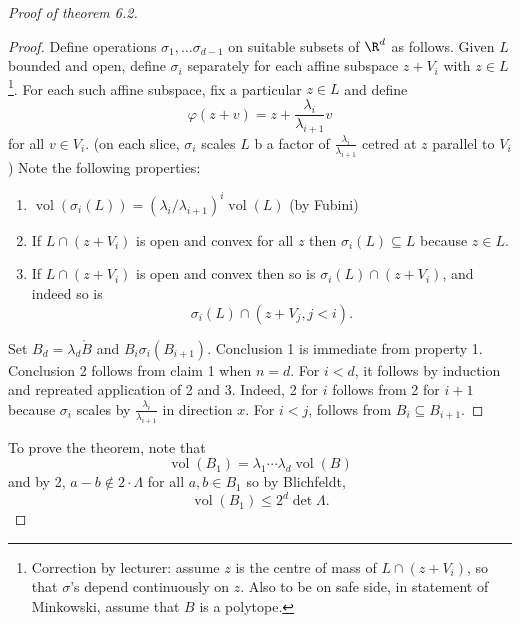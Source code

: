 \documentclass[a4paper]{article}
\begin{document}
\begin{proof}[Proof of theorem 6.2]
  \begin{proof}
    Define operations \(\sigma_1, \dots \sigma_{d - 1}\) on suitable subsets of \(\R^d\) as follows. Given \(L\) bounded and open, define \(\sigma_i\) separately for each affine subspace \(z + V_i\) with \(z \in L\)\footnote{Correction by lecturer: assume \(z\) is the centre of mass of \(L \cap (z + V_i)\), so that \(\sigma\)'s depend continuously on \(z\). Also to be on safe side, in statement of Minkowski, assume that \(B\) is a polytope.}. For each such affine subspace, fix a particular \(z \in L\) and define
    \[
      \varphi(z + v) = z + \frac{\lambda_i}{\lambda_{i + 1}} v
    \]
    for all \(v \in V_i\). (on each slice, \(\sigma_i\) scales \(L\) b a factor of \(\frac{\lambda_i}{\lambda_{i + 1}}\) cetred at \(z\) parallel to \(V_i\)) Note the following properties:
    \begin{enumerate}
    \item \(\operatorname{vol}(\sigma_i(L)) = (\lambda_i/\lambda_{i + 1})^i \operatorname{vol}(L)\) (by Fubini)
    \item If \(L \cap (z + V_i)\) is open and convex for all \(z\) then \(\sigma_i(L) \subseteq L\) because \(z \in L\).
    \item If \(L \cap (z + V_i)\) is open and convex then so is \(\sigma_i(L) \cap (z + V_i)\), and indeed so is
      \[
        \sigma_i(L) \cap (z + V_j, j < i).
      \]
    \end{enumerate}
    Set \(B_d = \lambda_d \ocirc B\) and \(B_i \sigma_i(B_{i + 1})\). Conclusion 1 is immediate from property 1. Conclusion 2 follows from claim 1 when \(n = d\). For \(i < d\), it follows by induction and repreated application of 2 and 3. Indeed, 2 for \(i\) follows from 2 for \(i + 1\) because \(\sigma_i\) scales by \(\frac{\lambda_i}{\lambda_{i + 1}}\) in direction \(x\). For \(i < j\), follows from \(B_i \subseteq B_{i + 1}\).
  \end{proof}

  To prove the theorem, note that
  \[
    \operatorname{vol}(B_1) = \lambda_1 \cdots \lambda_d \operatorname{vol}(B)
  \]
  and by 2, \(a - b \notin 2 \cdot \Lambda\) for all \(a, b \in B_1\) so by Blichfeldt,
  \[
    \operatorname{vol}(B_1) \leq 2^d \det \Lambda.
  \]
\end{proof}
\end{document}
